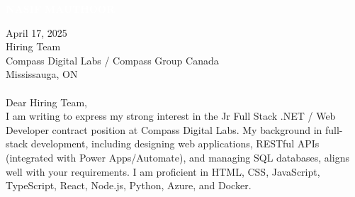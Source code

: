\documentclass[9pt]{src/developercv}
\begin{document}
\pagecolor{white}

\colorbox{sky900}{\hspace{0.3cm}\HUGE\textcolor{white}{\textbf{\MakeUppercase{Nasif}}}\hspace{0.3cm}}
\colorbox{sky800}{\hspace{0.3cm}\HUGE\textcolor{white}{\textbf{\MakeUppercase{Mauthoor}}}\hspace{0.3cm}}

\vspace{0.25cm}

\noindent\begin{minipage}[t]{0.2\textwidth}
    \vspace{-\baselineskip}
    \hspace{0.2cm}%
    \vcenteredhbox{\textcolor{black}{Oakville, ON}}%
\end{minipage}%
\begin{minipage}[t]{0.2\textwidth}
    \hspace{0.2cm}%
    \vcenteredhbox{\textcolor{black}{416-655-2083}}%
\end{minipage}%
\begin{minipage}[t]{0.3\textwidth}
    \hspace{0.2cm}%
    \vcenteredhbox{\textcolor{black}{info@nasifmauthoor.com}}%
\end{minipage}

\vspace{0.25cm}

\noindent April 17, 2025\\

\noindent Hiring Team\\
Compass Digital Labs / Compass Group Canada\\
Mississauga, ON\\\\

Dear Hiring Team,\\

I am writing to express my strong interest in the Jr Full Stack .NET / Web Developer contract position at Compass Digital Labs. My background in full-stack development, including designing web applications, RESTful APIs (integrated with Power Apps/Automate), and managing SQL databases, aligns well with your requirements. I am proficient in HTML, CSS, JavaScript, TypeScript, React, Node.js, Python, Azure, and Docker.\\
\end{document}
